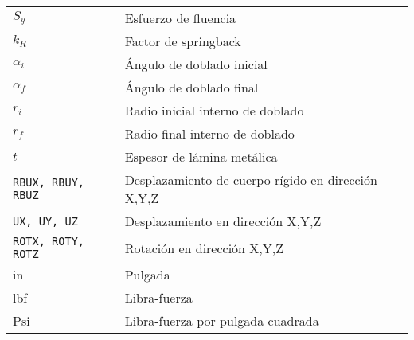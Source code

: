 \begin{table}[h]
\begin{tabular}{p{4cm} p{12cm}}
$ S_y $ &                                     Esfuerzo de fluencia \\
$ k_R $ &                                     Factor de springback \\
$ \alpha_i $ & 								  Ángulo de doblado inicial \\
$ \alpha_f $ & 								  Ángulo de doblado final \\
$ r_i $ & 									  Radio inicial interno de doblado \\
$ r_f $ & 									  Radio final interno de doblado \\
$ t $ &                                       Espesor de lámina metálica \\
{\tt RBUX, RBUY, RBUZ} &                      Desplazamiento de cuerpo rígido en dirección X,Y,Z \\
{\tt UX, UY, UZ} &                            Desplazamiento en dirección X,Y,Z \\
{\tt ROTX, ROTY, ROTZ} & 					  Rotación en dirección X,Y,Z \\
in &                                          Pulgada \\
lbf &                                         Libra-fuerza \\
Psi &                                         Libra-fuerza por pulgada cuadrada\\

\end{tabular}
\end{table}